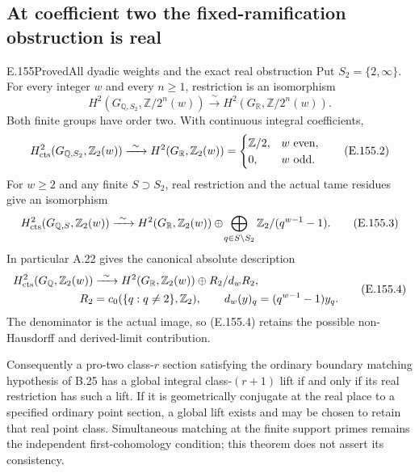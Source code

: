 \subsection{At coefficient two the fixed-ramification obstruction is real}

\begin{result}{E.155}{Proved}{All dyadic weights and the exact real obstruction}
Put \(S_2=\{2,\infty\}\). For every integer \(w\) and every \(n\geq1\),
restriction is an isomorphism
\[
 H^2(G_{\mathbb Q,S_2},\mathbb Z/2^n(w))
       \xrightarrow{\ \sim\ }
 H^2(G_{\mathbb R},\mathbb Z/2^n(w)).
 \tag{E.155.1}
\]
Both finite groups have order two. With continuous integral coefficients,
\[
 H^2_{\rm cts}(G_{\mathbb Q,S_2},\mathbb Z_2(w))
 \xrightarrow{\ \sim\ }H^2(G_{\mathbb R},\mathbb Z_2(w))
 =
 \begin{cases}
   \mathbb Z/2,&w\text{ even},\\
   0,&w\text{ odd}.
 \end{cases}
 \tag{E.155.2}
\]
For \(w\geq2\) and any finite \(S\supset S_2\), real restriction
and the actual tame residues give an isomorphism
\[
 H^2_{\rm cts}(G_{\mathbb Q,S},\mathbb Z_2(w))
 \xrightarrow{\ \sim\ }
 H^2(G_{\mathbb R},\mathbb Z_2(w))
 \oplus\!
 \bigoplus_{q\in S\setminus S_2}
      \mathbb Z_2/(q^{w-1}-1).
 \tag{E.155.3}
\]
In particular A.22 gives the canonical absolute description
\[
 \begin{split}
 H^2_{\rm cts}(G_{\mathbb Q},\mathbb Z_2(w))
 &\xrightarrow{\ \sim\ }
 H^2(G_{\mathbb R},\mathbb Z_2(w))\oplus R_2/d_wR_2,\\
 R_2&=c_0(\{q:q\ne2\},\mathbb Z_2),\qquad
 d_w(y)_q=(q^{w-1}-1)y_q .
 \end{split}
 \tag{E.155.4}
\]
The denominator is the actual image, so (E.155.4) retains
the possible non-Hausdorff and derived-limit contribution.

Consequently a pro-two class-\(r\) section satisfying the
ordinary boundary matching hypothesis of B.25 has a global
integral class-\((r+1)\) lift if and only if its real restriction
has such a lift. If it is geometrically conjugate at the real
place to a specified ordinary point section, a global lift exists
and may be chosen to retain that real point class. Simultaneous
matching at the finite support primes remains the independent
first-cohomology condition; this theorem does not assert its
consistency.
\end{result}
